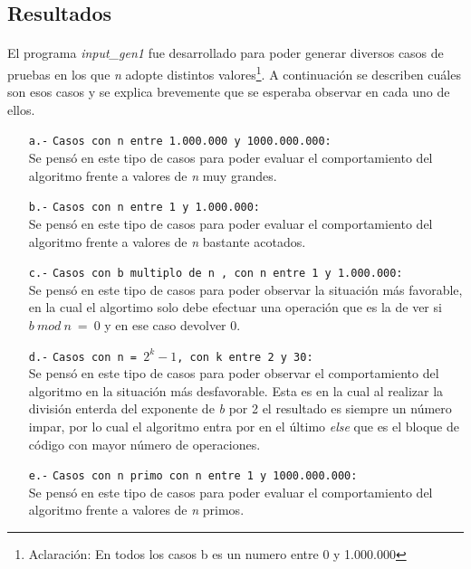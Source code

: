 
\subsection{Resultados}
\label{Resultados1}

\paragraph{}
El programa \textit{input\_gen1} fue desarrollado para poder generar diversos casos de pruebas en los que \textit{n} adopte distintos valores\footnote{Aclaración: En todos los casos b es un numero entre 0 y 1.000.000}. A continuación se describen cuáles son esos casos y se explica brevemente que se esperaba observar en cada uno de ellos.
	\begin{itemize}
		\item[\texttt{a.-}]{\texttt{Casos con n entre 1.000.000 y 1000.000.000:} \\
		Se pensó en este tipo de casos para poder evaluar el comportamiento del algoritmo frente a valores de \textit{n} muy grandes.}
		\item[\texttt{b.-}]{\texttt{Casos con n entre 1 y 1.000.000:} \\
		Se pensó en este tipo de casos para poder evaluar el comportamiento del algoritmo frente a valores de \textit{n} bastante acotados.}
		\item[\texttt{c.-}]{\texttt{Casos con b multiplo de n , con n entre 1 y 1.000.000:} \\
		Se pensó en este tipo de casos para poder observar la situación más favorable, en la cual el algortimo solo debe efectuar una operación que es la de ver si $b\ mod\ n\ =\ 0$ y en ese caso devolver 0.}
   		\item[\texttt{d.-}]{\texttt{Casos con n = $2^k - 1$, con k entre 2 y 30:} \\
		Se pensó en este tipo de casos para poder observar el comportamiento del algoritmo en la situación más desfavorable. Esta es en la cual al realizar la división enterda del exponente de \textit{b} por 2 el resultado es siempre un número impar, por lo cual el algoritmo entra por en el último \textit{else} que es el bloque de código con mayor número de operaciones.} 
		\item[\texttt{e.-}]{\texttt{Casos con n primo con n entre 1 y 1000.000.000:} \\
		Se pensó en este tipo de casos para poder evaluar el comportamiento del algoritmo frente a valores de \textit{n} primos.}
	\end{itemize}  

